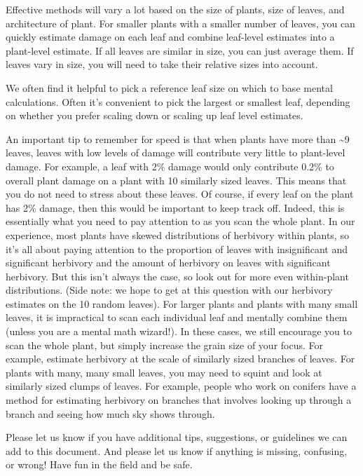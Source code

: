 \documentclass[
  letterpaper,
  DIV=11,
  numbers=noendperiod]{scrreprt}
\begin{document}
Effective methods will vary a lot based on the size of plants, size of
leaves, and architecture of plant. For smaller plants with a smaller
number of leaves, you can quickly estimate damage on each leaf and
combine leaf-level estimates into a plant-level estimate. If all leaves
are similar in size, you can just average them. If leaves vary in size,
you will need to take their relative sizes into account.

We often find it helpful to pick a reference leaf size on which to base
mental calculations. Often it's convenient to pick the largest or
smallest leaf, depending on whether you prefer scaling down or scaling
up leaf level estimates.

An important tip to remember for speed is that when plants have more
than \textasciitilde9 leaves, leaves with low levels of damage will
contribute very little to plant-level damage. For example, a leaf with
2\% damage would only contribute 0.2\% to overall plant damage on a
plant with 10 similarly sized leaves. This means that you do not need to
stress about these leaves. Of course, if every leaf on the plant has 2\%
damage, then this would be important to keep track off. Indeed, this is
essentially what you need to pay attention to as you scan the whole
plant. In our experience, most plants have skewed distributions of
herbivory within plants, so it's all about paying attention to the
proportion of leaves with insignificant and significant herbivory and
the amount of herbivory on leaves with significant herbivory. But this
isn't always the case, so look out for more even within-plant
distributions. (Side note: we hope to get at this question with our
herbivory estimates on the 10 random leaves). For larger plants and
plants with many small leaves, it is impractical to scan each individual
leaf and mentally combine them (unless you are a mental math wizard!).
In these cases, we still encourage you to scan the whole plant, but
simply increase the grain size of your focus. For example, estimate
herbivory at the scale of similarly sized branches of leaves. For plants
with many, many small leaves, you may need to squint and look at
similarly sized clumps of leaves. For example, people who work on
conifers have a method for estimating herbivory on branches that
involves looking up through a branch and seeing how much sky shows
through.

Please let us know if you have additional tips, suggestions, or
guidelines we can add to this document. And please let us know if
anything is missing, confusing, or wrong! Have fun in the field and be
safe.
\end{document}
